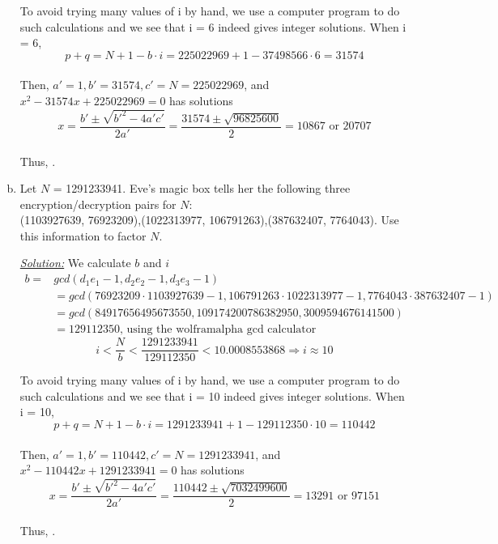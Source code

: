 \documentclass[12pt]{article}
\begin{document}
\begin{enumerate}[a)]
  To avoid trying many values of i by hand, we use a computer program to do such calculations and we see that i = 6 indeed gives integer solutions.  When i = 6, \\
  $$p+q=N+1-b \cdot i=225022969+1-37498566\cdot6=31574$$\\
  Then, $a'=1,b'=31574,c'=N=225022969$, and $x^{2}-31574x+225022969=0$ has solutions\\
  $$x=\frac{b'\pm\sqrt{b'^{2}-4a'c'}}{2a'}=\frac{31574\pm\sqrt{96825600}}{2}= 10867 \text{ or } 20707$$\\
  
  Thus, .
  \color{black}
  \pagebreak




  \item Let $N$ = 1291233941. Eve's magic box tells her the following three encryption/decryption pairs for $N$:\\
  (1103927639, 76923209),\hfill(1022313977, 106791263),\hfill(387632407, 7764043).
  Use this information to factor $N$.
  
  \color{blue}
  \item[\underline{\textit{Solution:}}] We calculate $b$ and $i$
  \begin{align*}
  b=&gcd(d_{1}e_{1}-1, d_{2}e_{2}-1, d_{3}e_{3}-1)\\
  &=gcd(76923209\cdot1103927639-1, 106791263\cdot1022313977-1, 7764043\cdot387632407-1)\\
  &=gcd(84917656495673550, 109174200786382950, 3009594676141500)\\
  &=129112350\textrm{, using the wolframalpha gcd calculator}
  \end{align*}
  $$i < \frac{N}{b} < \frac{1291233941}{129112350} < 10.0008553868 \Rightarrow i \approx 10$$
  
  To avoid trying many values of i by hand, we use a computer program to do such calculations and we see that i = 10 indeed gives integer solutions.  When i = 10, \\
  $$p+q=N+1-b\cdot i=1291233941+1-129112350\cdot10=110442$$\\
  Then, $a'=1,b'=110442,c'=N=1291233941$, and $x^{2}-110442x+1291233941=0$ has solutions\\
  $$x=\frac{b'\pm\sqrt{b'^{2}-4a'c'}}{2a'}=\frac{110442\pm\sqrt{7032499600}}{2}= 13291 \text{ or } 97151$$\\
  
  Thus, .
  \color{black}
  
\end{enumerate}\pagebreak
\end{document}
